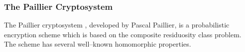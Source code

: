 
\subsubsection{The Paillier Cryptosystem}
The Paillier cryptosystem \cite{stern_public-key_1999}, developed by Pascal Paillier, is a probabilistic encryption scheme which is based on the composite residuosity class problem. The scheme has several well--known homomorphic properties.





